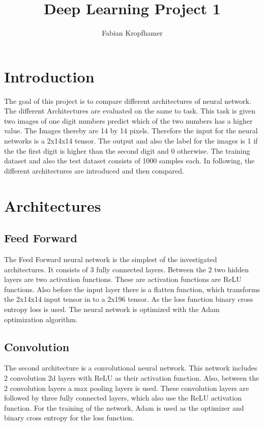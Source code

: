 \documentclass[12pt]{article}
\title{
	Deep Learning Project 1
}
\author{Fabian Kropfhamer}
\begin{document}
\maketitle

\section{Introduction}
The goal of this project is to compare different architectures of neural network.
The different Architectures are evaluated on the same to task.
This task is given two images of one digit numbers predict which of the two numbers has a higher value.
The Images thereby are 14 by 14 pixels.
Therefore the input for the neural networks is a 2x14x14 tensor.
The output and also the label for the images is 1 if the the first digit is higher than the second digit and 0 otherwise.
The training dataset and also the test dataset consists of 1000 samples each.
In following, the different architectures are introduced and then compared.  
\section{Architectures}
\subsection{Feed Forward}
The Feed Forward neural network is the simplest of the investigated architectures.
It consists of 3 fully connected layers.
Between the 2 two hidden layers are two activation functions.
These are activation functions are ReLU functions.
Also before the input layer there is a flatten function, which transforms the 2x14x14 input tensor in to a 2x196 tensor.
As the loss function binary cross entropy loss is used.
The neural network is optimized with the Adam optimization algorithm.
\subsection{Convolution}
The second architecture is a convolutional neural network.
This network includes 2 convolution 2d layers with ReLU as their activation function.
Also, between the 2 convolution layers a max pooling layers is used.
These convolution layers are followed by three fully connected layers, which also use the ReLU activation function.
For the training of the network, Adam is used as the optimizer and binary cross entropy for the loss function.
\end{document}
